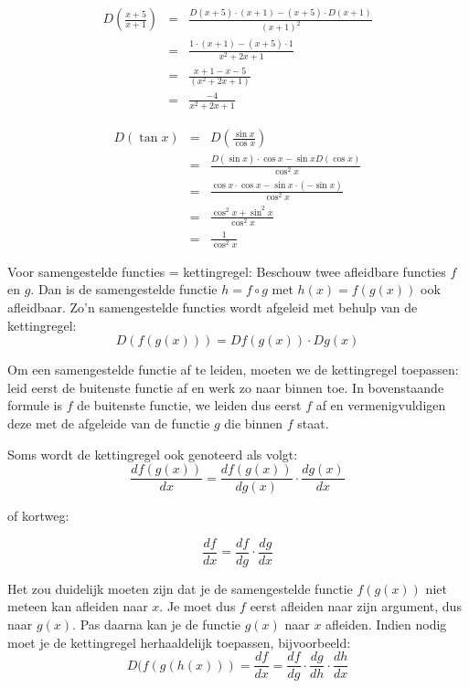 \begin{voorbeeld}
\begin{eqnarray*}
D(\frac{x+5}{x+1}) &=& \frac{D(x+5)\cdot (x+1)-(x+5)\cdot D(x+1)}{(x+1)^2} \\
&=& \frac{1 \cdot (x+1)-(x+5)\cdot 1}{x^2+2x+1} \\
&=& \frac{x+1-x-5}{(x^2+2x+1)}\\
&=& \frac{-4}{x^2+2x+1}
\end{eqnarray*}
\end{voorbeeld}

\begin{voorbeeld}
	\begin{eqnarray*}
		D(\tan x) &=& D(\frac{\sin x}{\cos x}) \\
		&=& \frac{D(\sin x) \cdot \cos x-\sin x D(\cos x)}{\cos ^2 x} \\
		&=& \frac{\cos x \cdot \cos x-\sin x \cdot (- \sin x)}{\cos ^2 x}\\
		&=& \frac{\cos^2 x + \sin^2 x}{\cos ^2 x} \\
		&=& \frac{1}{\cos ^2 x}
	\end{eqnarray*}
\end{voorbeeld}

\begin{ftrekenregel}
	Voor samengestelde functies = kettingregel:
	Beschouw twee afleidbare functies $f$ en $g$. Dan is de samengestelde functie $h=f \circ g$ met $h(x)=f(g(x))$ ook afleidbaar.
	Zo'n samengestelde functies wordt afgeleid met behulp van de kettingregel:
	\begin{equation*}
	D(f(g(x))) = Df(g(x)) \cdot Dg(x)
	\end{equation*}
\end{ftrekenregel}

Om een samengestelde functie af te leiden, moeten we de kettingregel toepassen: leid eerst de buitenste functie af en werk zo naar binnen toe. In bovenstaande formule is $f$ de buitenste functie, we leiden dus eerst $f$ af en vermenigvuldigen deze met de afgeleide van de functie $g$ die binnen $f$ staat.

Soms wordt de kettingregel ook genoteerd als volgt:
\[
\frac{df(g(x))}{dx}=\frac{df(g(x))}{dg(x)}\cdot\frac{dg(x)}{dx}
\]


of kortweg:

\[
\frac{df}{dx}=\frac{df}{dg}\cdot\frac{dg}{dx}
\]


Het zou duidelijk moeten zijn dat je de samengestelde functie $f(g(x))$
niet meteen kan afleiden naar $x$. Je moet dus $f$ eerst afleiden
naar zijn argument, dus naar $g(x)$. Pas daarna kan je de functie
$g(x)$ naar $x$ afleiden. Indien nodig moet je de kettingregel herhaaldelijk
toepassen, bijvoorbeeld: 
\[
D(f(g(h(x)))=\frac{df}{dx}=\frac{df}{dg}\cdot\frac{dg}{dh}\cdot\frac{dh}{dx}
\]
\medskip{}

